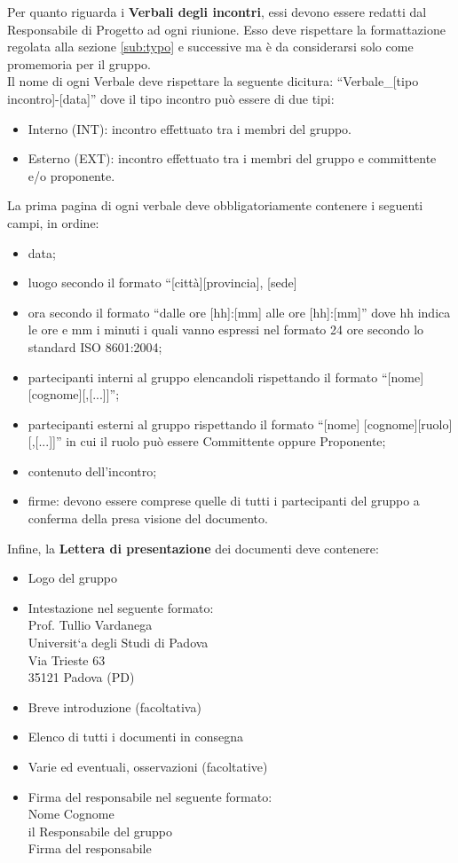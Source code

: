 {{\begin{itemize}
		\end{itemize}
		Per quanto riguarda i \textbf{Verbali degli incontri}, essi devono essere redatti dal Responsabile di Progetto ad ogni riunione. Esso deve rispettare la formattazione regolata alla sezione \ref{sub:typo} e successive ma \`{e} da considerarsi solo come promemoria per il gruppo.\\
		Il nome di ogni Verbale deve rispettare la seguente dicitura: “Verbale\_[tipo incontro]-[data]” dove il tipo incontro pu\`{o} essere di due tipi:
		\begin{itemize}
			\item Interno (INT): incontro effettuato tra i membri del gruppo.
			\item Esterno (EXT): incontro effettuato tra i membri del gruppo e committente e/o proponente.
		\end{itemize}
		La prima pagina di ogni verbale deve obbligatoriamente contenere i seguenti campi, in ordine:
		\begin{itemize}
			\item data;
			\item luogo secondo il formato “[citt\`{a}][provincia], [sede]
			\item ora secondo il formato “dalle ore [hh]:[mm] alle ore [hh]:[mm]” dove hh indica le ore e mm i minuti i quali vanno espressi nel formato 24 ore secondo lo standard ISO 8601:2004;
			\item partecipanti interni al gruppo elencandoli rispettando il formato “[nome] [cognome][,[...]]”;
			\item partecipanti esterni al gruppo rispettando il formato “[nome] [cognome][ruolo][,[...]]” in cui il ruolo pu\`{o} essere Committente oppure Proponente;
			\item contenuto dell'incontro;
			\item firme: devono essere comprese quelle di tutti i partecipanti del gruppo \gruppo a conferma della presa visione del documento.
		\end{itemize}
		Infine, la \textbf{Lettera di presentazione} dei documenti deve contenere:
		\begin{itemize}
			\item Logo del gruppo
			\item Intestazione nel seguente formato:\\
					Prof. Tullio Vardanega\\
					Universit`a degli Studi di Padova\\
					Via Trieste 63\\
					35121 Padova (PD)
			\item Breve introduzione (facoltativa)
			\item Elenco di tutti i documenti in consegna
			\item Varie ed eventuali, osservazioni (facoltative)
			\item Firma del responsabile nel seguente formato:\\
					{Nome} {Cognome}\\
					il Responsabile del gruppo \gruppo \\
					{Firma del responsabile}
		\end{itemize}		
	}
}
